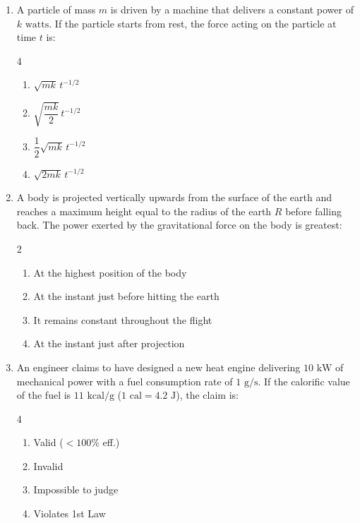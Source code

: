 \documentclass[11pt,a4paper]{article}
\begin{document}
\begin{enumerate}[label=\textbf{\arabic*.},leftmargin=18pt,itemsep=8pt]
  \item A particle of mass $m$ is driven by a machine that delivers a constant power of $k\text{ watts}$. If the particle starts from rest, the force acting on the particle at time $t$ is:
  \begin{multicols}{4}
    \begin{enumerate}[label=(\Alph*)]
      \item $\sqrt{mk}\,t^{-1/2}$
      \item $\sqrt{\dfrac{mk}{2}}\,t^{-1/2}$
      \item $\dfrac{1}{2}\sqrt{mk}\,t^{-1/2}$
      \item $\sqrt{2mk}\,t^{-1/2}$
    \end{enumerate}
  \end{multicols}

  \item A body is projected vertically upwards from the surface of the earth and reaches a maximum height equal to the radius of the earth $R$ before falling back. The power exerted by the gravitational force on the body is greatest:
  \begin{multicols}{2}
    \begin{enumerate}[label=(\Alph*)]
      \item At the highest position of the body
      \item At the instant just before hitting the earth
      \item It remains constant throughout the flight
      \item At the instant just after projection
    \end{enumerate}
  \end{multicols}

  \item An engineer claims to have designed a new heat engine delivering $10\text{ kW}$ of mechanical power with a fuel consumption rate of $1\text{ g/s}$. If the calorific value of the fuel is $11\text{ kcal/g}$ ($1\text{ cal} = 4.2\text{ J}$), the claim is:
  \begin{multicols}{4}
    \begin{enumerate}[label=(\Alph*)]
      \item Valid ($< 100\%$ eff.)
      \item Invalid
      \item Impossible to judge
      \item Violates 1st Law
    \end{enumerate}
  \end{multicols}


\end{enumerate}
\end{document}
